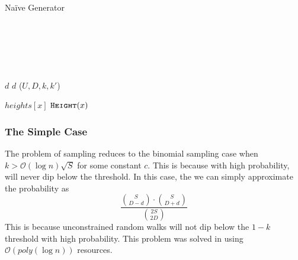 \begin{algorithm}[H]
    \caption{Na\"{i}ve Generator}
    \begin{algorithmic}
            \\
            \\\\
            \\
            \\
                \State \Return $d$
            \EndIf
                \State \Return $d$
            \EndIf
            \Return {}($U, D, k, k'$)

        \EndProcedure
                \State \Return $heights[x]$
            \EndIf
            \State \Return $\texttt{\textsc{Height}}(x)$
        \EndProcedure
    \end{algorithmic}
    \label{alg:naive}
\end{algorithm}



\subsubsection{The Simple Case}
The problem of sampling reduces to the binomial sampling case when $k > \mathcal{O}(\log n)\sqrt S$ for some constant $c$.
This is because with high probability, will never dip below the threshold.
In this case, the we can simply approximate the probability as
$$
\frac{{{S}\choose{D-d}}\cdot{{S}\choose{D+d}}}{{{2S}\choose{2D}}}
$$
This is because unconstrained random walks will not dip below the $1-k$ threshold with high probability.
This problem was solved in \cite{huge} using $\mathcal O(poly(\log n))$ resources.

